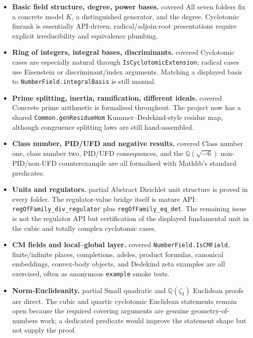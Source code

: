 \documentclass[UTF8,a4paper,11pt,fontset=fandol]{ctexart}
\theoremstyle{definition}
\newcommand{\covfull}{\textcolor{green!55!black}{\scriptsize\textsf{covered}}}
\newcommand{\covpart}{\textcolor{orange!85!black}{\scriptsize\textsf{partial}}}
\begin{document}
\begin{itemize}[leftmargin=0pt,label={},itemsep=0.12em,topsep=0.25em]
\item \textbf{Basic field structure, degree, power bases.} \covfull{}  All seven folders fix a concrete model \(K\), a distinguished generator, and the degree.  Cyclotomic finrank is essentially API-driven; radical/adjoin-root presentations require explicit irreducibility and equivalence plumbing.
\item \textbf{Ring of integers, integral bases, discriminants.} \covfull{}  Cyclotomic cases are especially natural through \texttt{IsCyclotomicExtension}; radical cases use Eisenstein or discriminant/index arguments.  Matching a displayed basis to \texttt{NumberField.integralBasis} is still manual.
\item \textbf{Prime splitting, inertia, ramification, different ideals.} \covfull{}  Concrete prime arithmetic is formalised throughout.  The project now has a shared \texttt{Common.genResidueHom} Kummer--Dedekind-style residue map, although congruence splitting laws are still hand-assembled.
\item \textbf{Class number, PID/UFD and negative results.} \covfull{}  Class number one, class number two, PID/UFD consequences, and the \(\mathbb Q(\sqrt{-6})\) non-PID/non-UFD counterexample are all formalised with Mathlib's standard predicates.
\item \textbf{Units and regulators.} \covpart{}  Abstract Dirichlet unit structure is proved in every folder.  The regulator-value bridge itself is mature API: \texttt{regOfFamily\_\allowbreak{}div\_\allowbreak{}regulator} plus \texttt{regOfFamily\_\allowbreak{}eq\_\allowbreak{}det}.  The remaining issue is not the regulator API but certification of the displayed fundamental unit in the cubic and totally complex cyclotomic cases.
\item \textbf{CM fields and local--global layer.} \covfull{}  \texttt{NumberField.IsCMField}, finite/infinite places, completions, adeles, product formulas, canonical embeddings, convex-body objects, and Dedekind zeta examples are all exercised, often as anonymous \texttt{example} smoke tests.
\item \textbf{Norm-Euclideanity.} \covpart{}  Small quadratic and \(\mathbb Q(\zeta_3)\) Euclidean proofs are direct.  The cubic and quartic cyclotomic Euclidean statements remain open because the required covering arguments are genuine geometry-of-numbers work; a dedicated predicate would improve the statement shape but not supply the proof.
\end{itemize}
\end{document}
